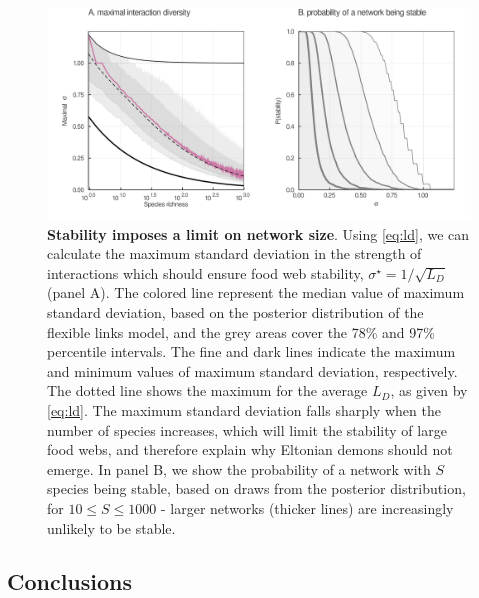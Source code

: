 \documentclass[12pt]{article}
\begin{document}
\begin{figure}
\hypertarget{fig:stability}{%
\centering
\includegraphics{figures/may.png}
\caption{\textbf{Stability imposes a limit on network size}. Using
\cref{eq:ld}, we can calculate the maximum standard deviation in the
strength of interactions which should ensure food web stability,
\(\sigma^\star = 1/\sqrt{L_D}\) (panel A). The colored line represent
the median value of maximum standard deviation, based on the posterior
distribution of the flexible links model, and the grey areas cover the
78\% and 97\% percentile intervals. The fine and dark lines indicate the
maximum and minimum values of maximum standard deviation, respectively.
The dotted line shows the maximum for the average \(L_D\), as given by
\cref{eq:ld}. The maximum standard deviation falls sharply when the
number of species increases, which will limit the stability of large
food webs, and therefore explain why Eltonian demons should not emerge.
In panel B, we show the probability of a network with \(S\) species
being stable, based on draws from the posterior distribution, for
\(10 \le S \le 1000\) - larger networks (thicker lines) are increasingly
unlikely to be stable.}\label{fig:stability}
}
\end{figure}

\hypertarget{conclusions}{%
\subsection{Conclusions}\label{conclusions}}
\end{document}
